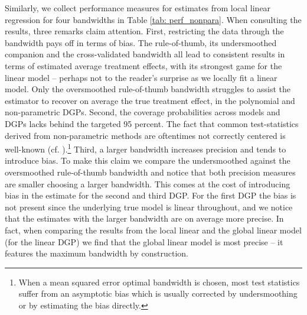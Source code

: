 Similarly, we collect performance measures for estimates from local linear regression for four bandwidths in Table \ref{tab: perf_nonpara}. When consulting the results, three remarks claim attention. First, restricting the data through the bandwidth pays off in terms of bias. The rule-of-thumb, its undersmoothed companion and the cross-validated bandwidth all lead to consistent results in terms of estimated average treatment effects, with its strongest game for the linear model -- perhaps not to the reader's surprise as we locally fit a linear model. Only the oversmoothed rule-of-thumb bandwidth struggles to assist the estimator to recover on average the true treatment effect, in the polynomial and non-parametric DGPs. Second, the coverage probabilities across models and DGPs lacks behind the targeted 95 percent. The fact that common test-statistics derived from non-parametric methods are oftentimes not correctly centered is well-known (cf. \cite{wasserman}).\footnote{When a mean squared error optimal bandwidth is chosen, most test statistics suffer from an asymptotic bias which is usually corrected by undersmoothing or by estimating the bias directly.} Third, a larger bandwidth increases precision and tends to introduce bias. To make this claim we compare the undersmoothed against the oversmoothed rule-of-thumb bandwidth and notice that both precision measures are smaller choosing a larger bandwidth. This comes at the cost of introducing bias in the estimate for the second and third DGP. For the first DGP the bias is not present since the underlying true model is linear throughout, and we notice that the estimates with the larger bandwidth are on average more precise. In fact, when comparing the results from the local linear and the global linear model (for the linear DGP) we find that the global linear model is most precise -- it features the maximum bandwidth by construction.

